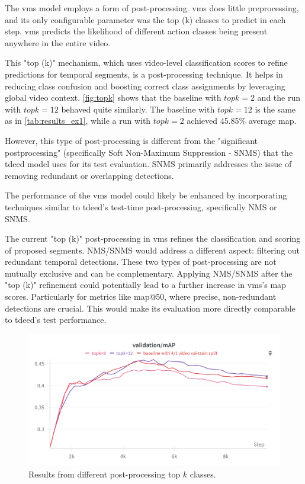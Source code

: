 The \acrshort{vms} model employs a form of post-processing. \acrshort{vms} does little preprocessing, and its only configurable parameter was the top (k) classes to predict in each step. \acrshort{vms} predicts the likelihood of different action classes being present anywhere in the entire video. 

This "top (k)" mechanism, which uses video-level classification scores to refine predictions for temporal segments, is a post-processing technique. It helps in reducing class confusion and boosting correct class assignments by leveraging global video context. \autoref{fig:topk} shows that the baseline with \(topk=2\) and the run with \(topk=12\) behaved quite similarly. The baseline with \(topk=12\) is the same as in \autoref{tab:results_ex1}, while a run with \(topk=2\) achieved 45.85\% average \acrshort{map}.

However, this type of post-processing is different from the "significant postprocessing" (specifically Soft Non-Maximum Suppression - SNMS) that the \acrshort{tdeed} model uses for its test evaluation. SNMS primarily addresses the issue of removing redundant or overlapping detections.

The performance of the \acrshort{vms} model could likely be enhanced by incorporating techniques similar to \acrshort{tdeed}'s test-time post-processing, specifically NMS or SNMS.

The current "top (k)" post-processing in \acrshort{vms} refines the classification and scoring of proposed segments.
NMS/SNMS would address a different aspect: filtering out redundant temporal detections.
These two types of post-processing are not mutually exclusive and can be complementary. Applying NMS/SNMS after the "top (k)" refinement could potentially lead to a further increase in \acrshort{vms}'s \acrshort{map} scores. Particularly for metrics like \acrshort{map}@50, where precise, non-redundant detections are crucial. This would make its evaluation more directly comparable to \acrshort{tdeed}'s test performance.

\begin{figure}
    \centering
    \includegraphics[width=0.75\linewidth]{figures/topk_classes.png}
    \caption{Results from different post-processing top \(k\) classes.}
    \label{fig:topk}
\end{figure}


